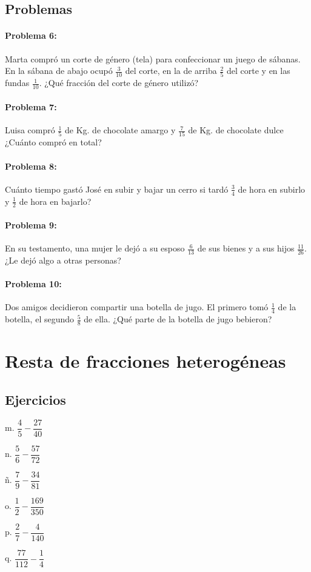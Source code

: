 \documentclass[10pt,twoside]{article}
\begin{document}
\subsection*{Problemas}
\paragraph*{Problema 6:} Marta compró un corte de género (tela) para confeccionar un juego de sábanas. En la sábana de abajo ocupó $\frac{3}{10}$ del corte, en la de arriba $\frac{2}{5}$ del corte y en las fundas $\frac{1}{10}$. ¿Qué fracción del corte de género utilizó?
\paragraph*{Problema 7:} Luisa compró $\frac{1}{5}$ de Kg. de chocolate amargo y $\frac{7}{15}$ de Kg. de chocolate dulce ¿Cuánto compró en total?
\paragraph*{Problema 8:} Cuánto tiempo gastó José en subir y bajar un cerro si tardó $\frac{3}{4}$ de hora en subirlo y $\frac{1}{2}$ de hora en bajarlo?
\paragraph*{Problema 9:} En su testamento, una mujer le dejó a su esposo $\frac{6}{13}$ de sus bienes y a sus hijos $\frac{11}{26}$. ¿Le dejó algo a otras personas?
\paragraph*{Problema 10:} Dos amigos decidieron compartir una botella de jugo. El primero tomó $\frac{1}{4}$ de la botella, el segundo $\frac{5}{8}$ de ella. ¿Qué parte de la botella de jugo bebieron?
\section*{Resta de fracciones heterog\'{e}neas}
\subsection*{Ejercicios}
\begin{enumerate}
\begin{multicols}{3}
\item[m.] $\dfrac{4}{5}-\dfrac{27}{40}$
\item[n.] $\dfrac{5}{6}-\dfrac{57}{72}$
\item[ñ.] $\dfrac{7}{9}-\dfrac{34}{81}$
\item[o.] $\dfrac{1}{2}-\dfrac{169}{350}$
\item[p.] $\dfrac{2}{7}-\dfrac{4}{140}$
\item[q.] $\dfrac{77}{112}-\dfrac{1}{4}$
\end{multicols}
\end{enumerate}
\end{document}
